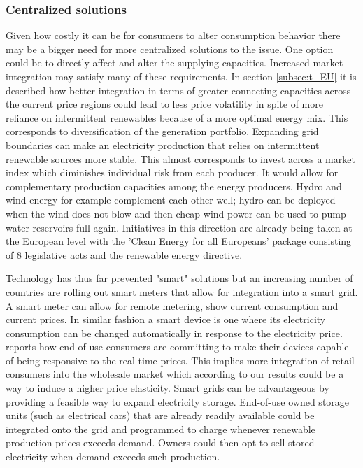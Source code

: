 \subsubsection{Centralized solutions}
Given how costly it can be for consumers to alter consumption behavior there may be a bigger need for more centralized solutions to the issue. One option could be to directly affect and alter the supplying capacities.
Increased market integration may satisfy many of these requirements. In section \ref{subsec:t_EU} it is described how better integration in terms of greater connecting capacities across the current price regions could lead to less price volatility in spite of more reliance on intermittent renewables because of a more optimal energy mix. This corresponds to diversification of the generation portfolio. Expanding grid boundaries can make an electricity production that relies on intermittent renewable sources more stable. This almost corresponds to invest across a market index which diminishes individual risk from each producer. It would allow for complementary production capacities among the energy producers. Hydro and wind energy for example complement each other well;  hydro can be deployed when the wind does not blow and then cheap wind power can be used to pump water reservoirs full again. Initiatives in this direction are already being taken at the European level with the 'Clean Energy for all Europeans' package consisting of 8 legislative acts and the renewable energy directive.
\bigskip

Technology has thus far prevented "smart" solutions but an increasing number of countries are rolling out smart meters that allow for integration into a smart grid. A smart meter can allow for remote metering, show current consumption and current prices. In similar fashion a smart device is one where its electricity consumption can be changed automatically in response to the electricity price.
\citet{biggar2014economics} reports how end-of-use consumers are committing to make their devices capable of being responsive to the real time prices. This implies more integration of retail consumers into the wholesale market which according to our results could be a way to induce a higher price elasticity. Smart grids can be advantageous by providing a feasible way to expand electricity storage. End-of-use owned storage units (such as electrical cars) that are already readily available could be integrated onto the grid and programmed to charge whenever renewable production prices exceeds demand. Owners could then opt to sell stored electricity when demand exceeds such production.


